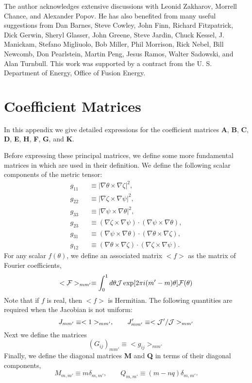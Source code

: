 \documentclass[prb,twocolumn,showpacs,preprintnumbers,amsmath,amssymb]{revtex4}
\renewcommand*{\t}[1]{\hbox{\sffamily\bfseries #1}}
\begin{document}
\begin{acknowledgments}
The author acknowledges extensive discussions with Leonid Zakharov,
Morrell Chance, and Alexander Popov.  He has also benefited from many
useful suggestions from Dan Barnes, Steve Cowley, John Finn, Richard
Fitzpatrick, Dick Gerwin, Sheryl Glasser, John Greene, Steve Jardin,
Chuck Kessel, J. Manickam, Stefano Migliuolo, Bob Miller, Phil Morrison,
Rick Nebel, Bill Newcomb, Don Pearlstein, Martin Peng, Jesus Ramos,
Walter Sadowski, and Alan Turnbull.  This work was supported by a
contract from the U. S.  Department of Energy, Office of Fusion Energy.
\end{acknowledgments}

\appendix

\section{\label{sec:coef}Coefficient Matrices}

In this appendix we give detailed expressions for the coefficient
matrices \t{A}, \t{B}, \t{C}, \t{D}, \t{E}, \t{H}, \t{F}, \t{G}, and
\t{K}.

Before expressing these principal matrices, we define some more
fundamental matrices in which are used in their definition.  We define
the following scalar components of the metric tensor:
\begin{eqnarray}
g_{11} &&\equiv |\nabla \theta \times \nabla \zeta|^2, \nonumber \\
g_{22} &&\equiv |\nabla \zeta \times \nabla \psi|^2, \nonumber \\
g_{33} &&\equiv |\nabla \psi \times \nabla \theta|^2, \nonumber \\
g_{23} &&\equiv (\nabla \zeta \times \nabla \psi)
	\cdot (\nabla \psi \times \nabla \theta), \nonumber \\
g_{31} &&\equiv (\nabla \psi \times \nabla \theta)
	\cdot (\nabla \theta \times \nabla \zeta), \nonumber \\
g_{12} &&\equiv (\nabla \theta \times \nabla \zeta)
	\cdot (\nabla \zeta \times \nabla \psi).
\end{eqnarray}
For any scalar $f(\theta)$, we define an associated matrix $<f>$ as the
matrix of Fourier coefficients,
\[
<{\cal F}>_{mm'} \equiv \int_0^1 d\theta {{\cal J}}
	\exp[2 \pi i (m'-m) \theta]  {\cal F}(\theta) 
\]
Note that if $f$ is real, then $<f>$ is Hermitian.  The following
quantities are required when the Jacobian is not uniform:
\[
J_{mm'} \equiv <1>_{mm'}, \qquad
J'_{mm'} \equiv <{\cal J}'/{\cal J}>_{mm'}
\]
Next we define the matrices
\[
(G_{ij})_{mm'} \equiv <g_{ij}>_{mm'}
\]
Finally, we define the diagonal matrices \t{M} and \t{Q} in terms of
their diagonal components,
\begin{equation}
M_{m,m'} \equiv m \delta_{m,m'}, \qquad 
Q_{m,m'} \equiv (m - n q) \delta_{m,m'}.
\label{eq:define_mq}
\end{equation}
\end{document}
